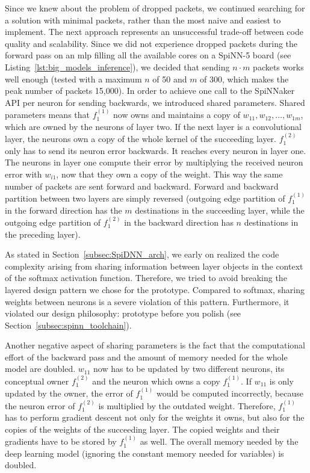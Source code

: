 \documentclass[]{article}
\begin{document}
Since we knew about the problem of dropped packets, we continued
searching for a solution with minimal packets, rather than the most
naive and easiest to implement.
The next approach represents an unsuccessful trade-off between code
quality and scalability.
Since we did not experience dropped packets during the forward pass on
an \acrshort{mlp} filling all the available cores on a SpiNN-5 board (see
Listing~\ref{lst:big_models_inference}), we decided that sending
$n \cdot m$ packets works well enough (tested with a maximum $n$ of 50
and $m$ of 300, which makes the peak number of packets 15,000).
In order to achieve one call to the SpiNNaker API per neuron for
sending backwards, we introduced shared parameters.
Shared parameters means that $f^{(1)}_1$ now owns and maintains a copy
of $w_{11}, w_{12}, \dots, w_{1m}$, which are owned by the neurons of
layer two.
If the next layer is a convolutional layer, the neurons own a copy of
the whole kernel of the succeeding layer.
$f^{(2)}_1$ only has to send its neuron error backwards.
It reaches every neuron in layer one.
The neurons in layer one compute their error by multiplying the
received neuron error with $w_{i1}$, now that they own a copy of the
weight.
This way the same number of packets are sent forward and backward.
Forward and backward partition between two layers are simply reversed
(outgoing edge partition of $f^{(1)}_1$ in the forward direction has
the $m$ destinations in the succeeding layer, while the outgoing
edge partition of $f^{(2)}_1$ in the backward direction has $n$
destinations in the preceding layer).

As stated in Section~\ref{subsec:SpiDNN_arch}, we early on realized
the code complexity arising from sharing information between layer
objects in the context of the softmax activation function.
Therefore, we tried to avoid breaking the layered design pattern
we chose for the prototype.
Compared to softmax, sharing weights between neurons is a severe
violation of this pattern.
Furthermore, it violated our design philosophy: prototype before you
polish (see Section~\ref{subsec:spinn_toolchain}).

Another negative aspect of sharing parameters is the fact that the
computational effort of the backward pass and the amount of memory
needed for the whole model are doubled.
$w_{11}$ now has to be updated by two different neurons, its
conceptual owner $f^{(2)}_1$ and the neuron which owns a copy
$f^{(1)}_1$.
If $w_{11}$ is only updated by the owner, the error of $f^{(1)}_1$
would be computed incorrectly, because the neuron error of $f^{(2)}_1$ is
multiplied by the outdated weight.
Therefore, $f^{(1)}_1$ has to perform gradient descent not only for
the weights it owns, but also for the copies of the weights of the
succeeding layer.
The copied weights and their gradients have to be stored by
$f^{(1)}_1$ as well.
The overall memory needed by the deep learning model (ignoring the
constant memory needed for variables) is doubled.
\end{document}

